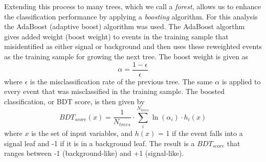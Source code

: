 Extending this process to many trees, which we call a \textit{forest}, allows us to enhance the classification performance by applying a  \textit{boosting} algorithm.  For this analysis the AdaBoost (adaptive boost) algorithm was used.  The AdaBoost algorthm gives added weight (boost weight) to events in the training sample that misidentified as either signal or background and then uses these reweighted events as the training sample for growing the next tree.  The boost weight is given as
\begin{equation}
	\alpha = \frac{1-\epsilon}{\epsilon}
\end{equation}
where $\epsilon$ is the misclassification rate of the previous tree.  The same $\alpha$ is applied to every event that was misclassified in the training sample. The boosted classification, or BDT score, is then given by
\begin{equation}
	BDT_{score}(x) = \frac{1}{N_{trees}}\cdot\sum_{i}^{N_{trees}}\ln(\alpha_i)\cdot h_i(x)
\end{equation}
where $x$ is the set of input variables, and $h(x)$ = 1 if the event falls into a signal leaf and -1 if it is in a background leaf.  The result is a $BDT_{score}$ that ranges between -1 (background-like) and +1 (signal-like).

